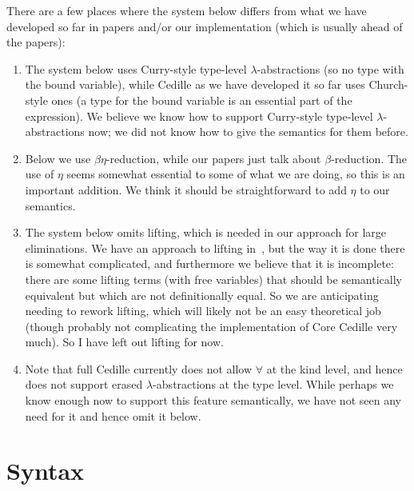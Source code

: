 \documentclass{article}
\begin{document}
There are a few places where the system below differs from what we
have developed so far in papers and/or our implementation (which is
usually ahead of the papers):

\begin{enumerate}
  \item The system below uses Curry-style type-level
    $\lambda$-abstractions (so no type with the bound variable), while
    Cedille as we have developed it so far uses Church-style ones (a
    type for the bound variable is an essential part of the
    expression).  We believe we know how to support Curry-style
    type-level $\lambda$-abstractions now; we did not know how to
    give the semantics for them before.  

  \item Below we use $\beta\eta$-reduction, while our papers
    just talk about $\beta$-reduction.  The use of $\eta$ seems
    somewhat essential to some of what we are doing, so this is an
    important addition.  We think it should be straightforward to
    add $\eta$ to our semantics.

  \item The system below omits lifting, which is needed in our
    approach for large eliminations.  We have an approach to lifting
    in~\cite{stump17a}, but the way it is done there is somewhat
    complicated, and furthermore we believe that it is incomplete: there
    are some lifting terms (with free variables) that should be semantically
    equivalent but which are not definitionally equal.  So we are
    anticipating needing to rework lifting, which will likely not be
    an easy theoretical job (though probably not complicating the implementation
    of Core Cedille very much).  So I have left out lifting for now.

  \item Note that full Cedille currently does not allow $\forall$ at the kind level,
    and hence does not support erased $\lambda$-abstractions at the type level.  While
    perhaps we know enough now to support this feature semantically, we have not
    seen any need for it and hence omit it below.

    \end{enumerate}

\section{Syntax}
\label{sec:syntax}
\end{document}
